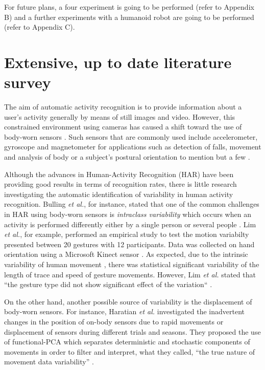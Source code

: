 \documentclass[9pt,journal,onecolumn,compsoc]{IEEEtran}
\begin{document}
For future plans, a four experiment is going to be performed (refer to Appendix B)
and a further experiments with a humanoid robot are going to be performed (refer to Appendix C).


\appendices

\section{Extensive, up to date literature survey}


The aim of automatic activity recognition is to provide information about a user's activity
generally by means of still images and video. 
However, this constrained environment using cameras has caused a shift toward the use of body-worn sensors \cite{bulling2014}.
Such sensors that are commonly used include accelerometer, gyroscope and magnetometer
for applications such as detection of falls, movement and analysis of body 
or a subject's postural orientation to mention but a few \cite{Mukhopadhyay2014}.

Although the advances in Human-Activity Recognition (HAR) have been providing good results in terms of recognition rates,
there is little research investigating the automatic identification of variability in human activity recognition.
Bulling \textit{et al.}, for instance, stated that one of the common challenges in HAR 
using body-worn sensors is \textit{intraclass variability} which occurs when 
an activity is performed differently either by a single person or several people \cite{bulling2014} . 
Lim \textit{et al.}, for example, performed an empirical study to test the motion variabilty 
presented between 20 gestures with 12 participants. %
Data was collected on hand orientation using a Microsoft Kinect sensor \cite{Lim2012}. %
As expected, due to the intrinsic variability of human movement \cite{newell1993variability}, 
there was statistical significant variability of the length of trace and speed of gesture movements.
However, Lim \textit{et al.} stated that ``the gesture type did not show significant effect of the variation`` \cite{Lim2012}.

On the other hand, another possible source of variability is the displacement of body-worn sensors. 
For instance, Haratian \textit{et al.} investigated the inadvertent changes in the position of on-body sensors 
due to rapid movements or displacement of sensors during different trials and seasons.
They proposed the use of functional-PCA 
which separates deterministic and stochastic components of movements
in order to filter and interpret, what they called, ``the true nature of movement data variability'' 
\cite{Haratian2012,Haratian2014,Haratian2016}.
\end{document}
